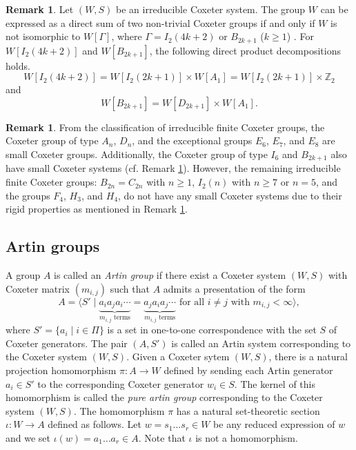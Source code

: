\documentclass[12pt]{amsart}
\theoremstyle{definition}
\newtheorem{remark}[equation]{Remark}
\numberwithin{equation}{section}
\begin{document}
\par

\begin{remark}\label{rmk:finrig}
Let $(W,S)$ be an irreducible Coxeter system. The group $W$ can be expressed as a direct sum of two non-trivial Coxeter groups if and only if $W$ is not isomorphic to $W[\Gamma]$, where $\Gamma = I_2(4k+2)$ or $B_{2k+1}$ ($k \geq 1$) \cite[Theorem 3.3]{MR2240393}. For $W[I_2({4k+2})]$ and $W[B_{2k+1}]$, the following direct product decompositions holds.
 $$W[I_2(4k+2)] =W[I_2(2k+1)]\times W[A_1]=W[I_2(2k+1)] \times \mathbb Z_2$$
 and 
 $$W[B_{2k+1}]=W[D_{2k+1}]\times W[A_1].$$
 \end{remark}
 
 \begin{remark}
 From the classification of irreducible finite Coxeter groups, the Coxeter group of type $A_n$, $D_n$, and the exceptional groups $E_6$, $E_7$, and $E_8$ are small Coxeter groups. Additionally, the Coxeter group of type $I_6$ and $B_{2k+1}$ also have small Coxeter systems (cf. Remark \ref{rmk:finrig}). However, the remaining irreducible finite Coxeter groups: $B_{2n}=C_{2n}$ with $n \geq 1$, $I_2(n)$ with $n \geq 7$ or $n=5$, and the groups $F_4$, $H_3$, and $H_4$, do not have any small Coxeter systems due to their rigid properties as mentioned in Remark \ref{rmk:finrig}.
\end{remark}

\subsection{Artin groups}
A group $A$  is called an {\it Artin group} if there exist a  Coxeter system $(W, S)$ with Coxeter matrix $(m_{i,j})$ such that $A$ admits a  presentation of the form  
\begin{equation}\label{Artin presentation}
A = \big\langle S' \mid \underbrace{a_i a_j a_i \cdots}_{m_{i,j} \text{ terms}} = \underbrace{a_j a_i a_j \cdots}_{m_{i,j} \text{ terms}} \text{ for all } i \neq j \text{ with } m_{i,j} < \infty \big\rangle,
\end{equation}
where $S'= \{ a_i \mid i \in \Pi\}$ is a set in one-to-one correspondence with the set  $S$ of Coxeter generators. The pair $(A, S')$ is called an Artin system corresponding to the Coxeter system $(W,S)$. Given a Coxeter sytem $(W,S)$, there is a natural projection homomorphism $\pi:A\to W$ defined by sending each Artin generator $a_i\in S'$ to the corresponding Coxeter generator $w_i\in S$. The kernel of this homomorphism is called the {\it pure artin group} corresponding to the Coxeter system $(W,S)$. The homomorphism $\pi$ has a natural set-theoretic section $\iota: W \to A$ defined as follows. Let $w = s_1\ldots s_r \in W$ be any reduced expression of $w$ and we set $\iota(w)=a_1\ldots a_r \in A$. Note that $\iota$ is not a homomorphism. 
\end{document}
